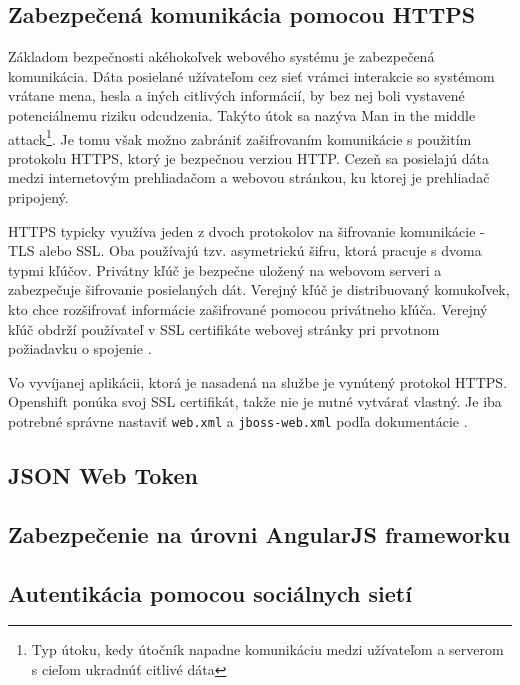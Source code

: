 \documentclass[12pt,oneside]{fithesis2}
\begin{document}
      		\subsection{Zabezpečená komunikácia pomocou HTTPS}
      		\par Základom bezpečnosti akéhokoľvek webového systému je zabezpečená komunikácia. Dáta posielané užívateľom cez sieť vrámci interakcie so systémom vrátane mena, hesla a iných citlivých informácií, by bez nej boli vystavené potenciálnemu riziku odcudzenia. Takýto útok sa nazýva Man in the middle attack\footnote{Typ útoku, kedy útočník napadne komunikáciu medzi užívateľom a serverom s cieľom ukradnúť citlivé dáta}. Je tomu však možno zabrániť zašifrovaním komunikácie s použitím protokolu HTTPS, ktorý je bezpečnou verziou HTTP. Cezeň sa posielajú dáta medzi internetovým prehliadačom a webovou stránkou, ku ktorej je prehliadač pripojený. 
      		\par HTTPS typicky využíva jeden z dvoch protokolov na šifrovanie komunikácie - TLS alebo SSL. Oba používajú tzv. asymetrickú šifru, ktorá pracuje s dvoma typmi kľúčov. Privátny kľúč je bezpečne uložený na webovom serveri a zabezpečuje šifrovanie posielaných dát. Verejný kľúč je distribuovaný komukoľvek, kto chce rozšifrovať informácie zašifrované pomocou privátneho kľúča. Verejný kľúč obdrží používateľ v SSL certifikáte webovej stránky pri prvotnom požiadavku o spojenie \cite{comodo15}.
      		\par Vo vyvíjanej aplikácii, ktorá je nasadená na službe je vynútený protokol HTTPS. Openshift ponúka svoj SSL certifikát, takže nie je nutné vytvárať vlastný. Je iba potrebné správne nastaviť \texttt{web.xml} a \texttt{jboss-web.xml} podľa dokumentácie \cite{openshift15}.
      		\pagebreak

      		\subsection{JSON Web Token}
      		\subsection{Zabezpečenie na úrovni AngularJS frameworku}
      		\par 
      		\subsection{Autentikácia pomocou sociálnych sietí}
      		
\end{document}
